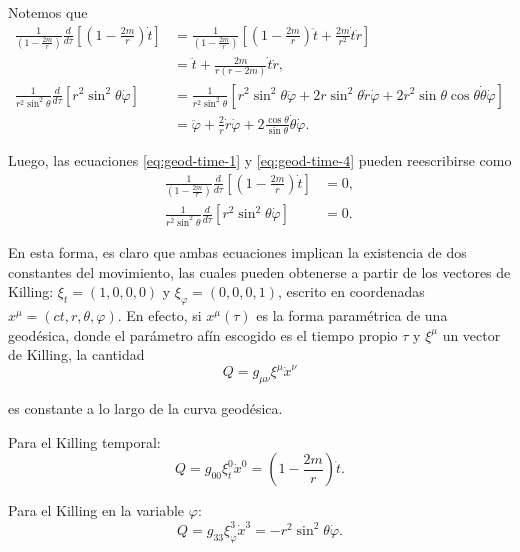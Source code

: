 \documentclass[letterpaper,11pt]{article}
\begin{document}
Notemos que
\begin{align}
    \frac{1}{\left( 1 - \frac{2m}{r} \right)} \frac{d}{d\tau} \left[ \left( 1 -  \frac{2m}{r} \right) \dot{t} \right] &= \frac{1}{\left( 1 - \frac{2m}{r} \right)} \left[ \left( 1 - \frac{2m}{r} \right) \ddot{t} + \frac{2m}{r^2} \dot{t} \dot{r} \right] \\
    &= \ddot{t} + \frac{2m}{r\left( r - 2m \right)} \dot{t} \dot{r}, \\
    \frac{1}{r^2 \sin^2\theta} \frac{d}{d\tau} \left[ r^2 \sin^2 \theta \dot{\varphi} \right] &= \frac{1}{r^2\sin^2\theta} \left[ r^2\sin^2\theta \ddot{\varphi} + 2r \sin^2\theta \dot{r} \dot{\varphi} + 2 r^2 \sin \theta \cos\theta \dot{\theta} \dot{\varphi}\right] \\
    &= \ddot{\varphi} + \frac{2}{r} \dot{r} \dot{\varphi} + 2 \frac{\cos\theta}{\sin\theta} \dot{\theta} \dot{\varphi}.
\end{align}

Luego, las ecuaciones \eqref{eq:geod-time-1} y \eqref{eq:geod-time-4} pueden reescribirse como
\begin{align}
    \frac{1}{\left( 1 - \frac{2m}{r} \right)} \frac{d}{d\tau} \left[ \left( 1 -  \frac{2m}{r} \right) \dot{t} \right] &= 0, \\
     \frac{1}{r^2 \sin^2\theta} \frac{d}{d\tau} \left[ r^2 \sin^2 \theta \dot{\varphi} \right] &= 0.
\end{align}

En esta forma, es claro que ambas ecuaciones implican la existencia de dos constantes del movimiento, las cuales pueden obtenerse a partir de los vectores de Killing: $\xi_t = (1,0,0,0)$ y $\xi_{\varphi} = (0,0,0,1)$,  escrito en coordenadas $x^{\mu} = (ct,r,\theta,\varphi)$. En efecto, si $x^{\mu}(\tau)$ es la forma paramétrica de una geodésica, donde el parámetro afín escogido es el tiempo propio $\tau$ y $\xi^{\mu}$ un vector de Killing, la cantidad
\begin{equation}
    Q = g_{\mu\nu} \xi^{\mu} \dot{x}^{\nu}
\end{equation}

es constante a lo largo de la curva geodésica.

Para el Killing temporal:
\begin{equation}
    Q = g_{00} \xi_t^0 \dot{x}^0 = \left( 1 - \frac{2m}{r} \right) \dot{t}.
\end{equation}

Para el Killing en la variable $\varphi$:
\begin{equation}
    Q = g_{33} \xi_{\varphi}^3 \dot{x}^3 =  - r^2 \sin^2\theta  \dot{\varphi}.
\end{equation}
\end{document}
